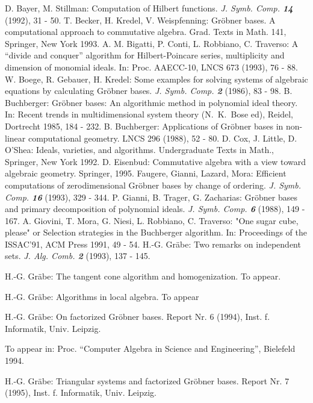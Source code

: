 \documentclass[a4paper,11pt]{article}
\newcommand{\gr}{Gr\"obner}
\begin{document}
\pagebreak

\begin{thebibliography}{xxx}
 D. Bayer, M. Stillman: Computation of Hilbert
functions. {\it J. Symb. Comp. \bf 14} (1992), 31 - 50.
 T. Becker, H. Kredel, V. Weispfenning: {\gr} bases. A
computational approach to commutative algebra. Grad. Texts in Math.
141, Springer, New York 1993.
 A. M. Bigatti, P. Conti, L. Robbiano, C. Traverso: A
``divide and conquer'' algorithm for Hilbert-Poincare series,
multiplicity and dimension of monomial ideals. In: Proc. AAECC-10,
LNCS 673 (1993), 76 - 88.
 W. Boege, R. Gebauer, H. Kredel: Some examples for
solving systems of algebraic equations by calculating {\gr} bases. {\it
J. Symb. Comp. \bf 2} (1986), 83 - 98.
 B. Buchberger: {\gr} bases: An algorithmic method in
polynomial ideal theory. In: Recent trends in multidimensional
system theory (N.~K.~Bose ed), Reidel, Dortrecht 1985, 184 - 232.
 B. Buchberger: Applications of {\gr} bases in non-linear
computational geometry. LNCS 296 (1988), 52 - 80.
 D. Cox, J. Little, D. O'Shea: Ideals, varieties, and
algorithms.  Undergraduate Texts in Math., Springer, New York 1992.
 D. Eisenbud: Commutative algebra with a view toward
algebraic geometry. Springer, 1995. 
 Faugere, Gianni, Lazard, Mora: Efficient computations
of zerodimensional {\gr} bases by change of ordering. {\it
J. Symb. Comp. \bf 16} (1993), 329 - 344. 
 P. Gianni, B. Trager, G. Zacharias: {\gr} bases and
primary decomposition of polynomial ideals. {\it J. Symb. Comp. \bf
6} (1988), 149 - 167.
 A. Giovini, T. Mora, G. Niesi, L. Robbiano, C.
Traverso: "One sugar cube, please" or Selection strategies in the
Buchberger algorithm. In: Proceedings of the ISSAC'91, ACM Press
1991, 49 - 54.
 H.-G. Gr\"abe: Two remarks on independent sets.
{\it J. Alg. Comb. \bf 2} (1993), 137 - 145. 

 H.-G. Gr\"abe: The tangent cone algorithm and
homogenization. To appear.

 H.-G. Gr\"abe: Algorithms in local algebra. To appear

 H.-G. Gr\"abe: On factorized {\gr} bases. Report Nr. 6
(1994), Inst. f. Informatik, Univ. Leipzig.

To appear in: Proc. ``Computer Algebra in Science and Engineering'',
Bielefeld 1994.

 H.-G. Gr\"abe: Triangular systems and factorized {\gr}
bases. Report Nr. 7 (1995), Inst. f. Informatik, Univ. Leipzig.


\end{thebibliography}
\end{document}
